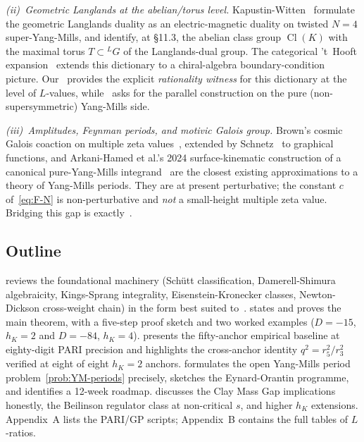 \documentclass[11pt]{amsart}
\theoremstyle{definition}
\theoremstyle{remark}
\DeclareMathOperator{\Cl}{Cl}
\begin{document}
\emph{(ii)~Geometric Langlands at the abelian/torus level.}
Kapustin-Witten~\cite{KapustinWitten2006} formulate the
geometric Langlands duality as an electric-magnetic duality on twisted
$N=4$ super-Yang-Mills, and identify, at \S 11.3, the abelian class
group $\Cl(K)$ with the maximal torus $T \subset {}^L\!G$ of the
Langlands-dual group. The categorical 't~Hooft
expansion~\cite{Gaiotto2025} extends this dictionary to a chiral-algebra
boundary-condition picture. Our~ provides the explicit
\emph{rationality witness} for this dictionary at the level of
$L$-values, while~ asks for the parallel
construction on the pure (non-supersymmetric) Yang-Mills side.

\emph{(iii)~Amplitudes, Feynman periods, and motivic Galois group.}
Brown's cosmic Galois coaction on multiple zeta
values~\cite{Brown2017}, extended by Schnetz~\cite{Schnetz2025} to
graphical functions, and Arkani-Hamed et al.'s 2024 surface-kinematic
construction of a canonical pure-Yang-Mills
integrand~\cite{ArkaniHamed2024} are the closest existing approximations
to a theory of Yang-Mills periods. They are at present perturbative;
the constant $c$ of~\eqref{eq:F-N} is non-perturbative and
\emph{not} a small-height multiple zeta value. Bridging this gap is
exactly~.

\subsection{Outline}
\label{ss:outline}
 reviews the foundational machinery (Sch\"utt
classification, Damerell-Shimura algebraicity, Kings-Sprang
integrality, Eisenstein-Kronecker classes, Newton-Dickson cross-weight
chain) in the form best suited to~.
 states and proves the main theorem,
with a five-step proof sketch and two worked examples
($D = -15$, $h_K = 2$ and $D = -84$, $h_K = 4$).
 presents the fifty-anchor empirical baseline at
eighty-digit PARI precision and highlights the cross-anchor identity
$q^2 = r_5^2 / r_3^2$ verified at eight of eight $h_K = 2$ anchors.
 formulates the open Yang-Mills period
problem~\eqref{prob:YM-periods} precisely, sketches the
Eynard-Orantin programme, and identifies a 12-week roadmap.
 discusses the Clay Mass Gap implications honestly,
the Beilinson regulator class at non-critical $s$, and higher $h_K$
extensions. Appendix~A lists the PARI/GP scripts; Appendix~B contains
the full tables of $L$-ratios.
\end{document}
